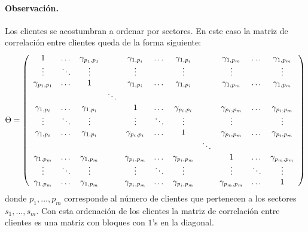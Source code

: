 \paragraph{Observaci\'on.} Los clientes se acostumbran a ordenar por sectores. En este
caso la matriz de correlaci\'on entre clientes queda de la forma siguiente:
\begin{displaymath}
\Theta = \left(
\begin{array}{ccccccccccc}
1                & \dots    & \gamma_{p_1,p_1}  &          & \gamma_{1,p_i}   & \dots   & \gamma_{1,p_i}    &         & \gamma_{1,p_m}   & \dots      & \gamma_{1,p_m}   \cr
\vdots           & \ddots   & \vdots            &          & \vdots           &         & \vdots            &         & \vdots           &            & \vdots           \cr
\gamma_{p_1,p_1} & \dots    & 1                 &          & \gamma_{1,p_i}   & \dots   & \gamma_{1,p_i}    &         & \gamma_{1,p_m}   & \dots      & \gamma_{1,p_m}   \cr
                 
                 &          &                   & \ddots   &                  &         &                   &         &                  &            &                  \cr

\gamma_{1,p_i}   & \dots    & \gamma_{1,p_i}    &          & 1                & \dots   & \gamma_{p_i,p_i}  &         & \gamma_{p_i,p_m} & \dots      & \gamma_{p_i,p_m} \cr
\vdots           & \ddots   & \vdots            &          & \vdots           & \ddots  & \vdots            &         & \vdots           &            & \vdots           \cr
\gamma_{1,p_i}   & \dots    & \gamma_{1,p_i}    &          & \gamma_{p_i,p_i} & \dots   & 1                 &         & \gamma_{p_i,p_m} & \dots      & \gamma_{p_i,p_m} \cr

                 &          &                   &          &                  &         &                   & \ddots  &                  &            &                  \cr

\gamma_{1,p_m}   & \dots    & \gamma_{1,p_m}    &          & \gamma_{p_i,p_m} & \dots   & \gamma_{p_i,p_m}  &         & 1                & \dots      & \gamma_{p_m,p_m} \cr
\vdots           & \ddots   & \vdots            &          & \vdots           & \ddots  & \vdots            &         & \vdots           & \ddots     & \vdots           \cr
\gamma_{1,p_m}   & \dots    & \gamma_{1,p_m}    &          & \gamma_{p_i,p_m} & \dots   & \gamma_{p_i,p_m}  &         & \gamma_{p_m,p_m} & \dots      & 1               
\end{array}
\right)
\end{displaymath}
donde $p_1, \dots, p_m$ corresponde al n\'umero de clientes que pertenecen a los sectores $s_1, \dots, s_m$.
Con esta ordenaci\'on de los clientes la matriz de correlaci\'on entre clientes es una matriz
con bloques con $1$'s en la diagonal.


